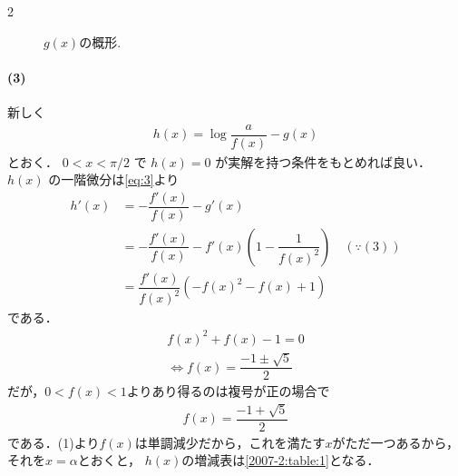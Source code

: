 \documentclass[../../main.tex]{subfiles}
\begin{document}
\begin{multicols}{2}
\begin{figure}[H]
    \caption{$g(x)$の概形.}
    \label{2007-2:fig:2}
  \end{figure}

  \paragraph{(3)}
  新しく
  \begin{align}
    h(x) = \log \dfrac{a}{f(x)} - g(x)
  \end{align}
  とおく．
  $0 < x < \pi/2$ で $h(x)=0$ が実解を持つ条件をもとめれば良い．
  $h(x)$ の一階微分は\cref{eq:3}より
  \begin{align}
    h'(x)
    & = - \dfrac{f'(x)}{f(x)} - g'(x)                                                       \\
    & = - \dfrac{f'(x)}{f(x)} - f'(x)\left(1 - \dfrac{1}{f(x)^2}\right) \quad (\because (3)) \\
    & = \dfrac{f'(x)}{f(x)^2} (-f(x)^2 - f(x)+1)
  \end{align}
  である．
  \begin{align}
    f(x)^2 + f(x) -1 = 0 \\
    \iff
    f(x) = \dfrac{-1 \pm \sqrt{5}}{2}
  \end{align}
  だが，$0<f(x)<1$よりあり得るのは複号が正の場合で
  \begin{align}
    f(x) = \dfrac{-1 + \sqrt{5}}{2}
  \end{align}
  である．(1)より$f(x)$は単調減少だから，これを満たす$x$がただ一つあるから，
  それを$x=\alpha$とおくと，
  $h(x)$の増減表は\cref{2007-2:table:1}となる．


\end{multicols}
\end{document}
